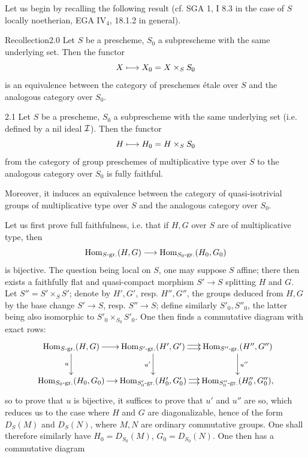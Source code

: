  Let us begin by recalling the following result (cf. SGA 1, I 8.3 in the case of $S$ locally noetherian, EGA IV$_4$, 18.1.2 in general).
\begin{enonce}{Recollection}{2.0}\label{X.2.0}
Let $S$ be a prescheme, $S_0$ a subprescheme with the same underlying set. Then the functor
\[
X\mto X_0=X\times_S S_0
\]
is an equivalence between the category of preschemes étale over $S$ and the analogous category over $S_0$.
\end{enonce}
\begin{proposition}{2.1}\label{X.2.1}
Let $S$ be a prescheme, $S_0$ a subprescheme with the same underlying set (i.e. defined by a nil ideal $\cal I$). Then the functor
\[
H\mto H_0=H\times_S S_0
\]
from the category of group preschemes of multiplicative type over $S$ to the analogous category over $S_0$ is fully faithful.

Moreover, it induces an equivalence between the category of quasi-isotrivial groups of multiplicative type over $S$ and the analogous category over $S_0$.
\end{proposition}
Let us first prove full faithfulness, i.e. that if $H,G$ over $S$ are of multiplicative type, then
\[
\Hom_{S\text{-}\mathrm{gr.}}(H,G)\to\Hom_{S_0\text{-}\mathrm{gr.}}(H_0,G_0)
\]
is bijective. The question being local on $S$, one may suppose $S$ affine; there then exists a faithfully flat and quasi-compact morphism $S'\to S$ splitting $H$ and $G$. Let $S''=S'\times_S S'$; denote by $H',G'$, resp. $H'',G''$, the groups deduced from $H,G$ by the base change $S'\to S$, resp. $S''\to S$; define similarly $S'_0,S''_0$, the latter being also isomorphic to $S'_0\times_{S_0}S'_0$. One then finds a commutative diagram with exact rows:
\begingroup\small
\[
\xymatrix@C=12pt{\Hom_{S\text{-}\mathrm{gr.}}(H,G)\ar[r]\ar[d]_u&\Hom_{S'\text{-}\mathrm{gr.}}(H',G')\ar@<.5ex>[r]\ar@<-.5ex>[r]\ar[d]_{u'}&\Hom_{S''\text{-}\mathrm{gr.}}(H'',G'')\ar[d]^{u''}\\\Hom_{S_0\text{-}\mathrm{gr.}}(H_0,G_0)\ar[r]&\Hom_{S'_0\text{-}\mathrm{gr.}}(H'_0,G'_0)\ar@<.5ex>[r]\ar@<-.5ex>[r]&\Hom_{S''_0\text{-}\mathrm{gr.}}(H''_0,G''_0),}
\]
\endgroup
so to prove that $u$ is bijective, it suffices to prove that $u'$ and $u''$ are so, which reduces us to the case where $H$ and $G$ are diagonalizable, hence of the form $D_S(M)$ and $D_S(N)$, where $M,N$ are ordinary commutative groups. One shall therefore similarly have $H_0=D_{S_0}(M)$, $G_0=D_{S_0}(N)$. One then has a commutative diagram

